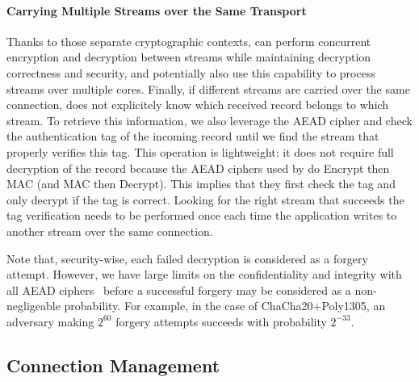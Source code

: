 \paragraph*{Carrying Multiple Streams over the Same Transport}
Thanks to those separate cryptographic contexts, \tcpls can perform concurrent
encryption and decryption between streams while maintaining decryption
correctness and security, and potentially also use this capability to process
streams over multiple cores. Finally, if different streams are carried
over the same \tcp connection, \tcpls does not explicitely know which
received record belongs to which stream. To retrieve this information,
we also
leverage the AEAD cipher and check the authentication tag of the incoming record until we find the stream that properly verifies this tag. This
operation is lightweight: it does not require full decryption of the record
because the AEAD ciphers used by  do Encrypt then MAC (and MAC then
Decrypt). This implies that they first check the tag and only decrypt if the tag is correct. Looking for the right stream that succeeds the tag verification needs to be performed once each time the application writes to another stream over the same \tcp connection.

Note that, security-wise, each failed decryption is considered as a
forgery attempt. However, we have large limits on the confidentiality and
integrity with all AEAD ciphers~\cite{luykx2015limits, aeadlimits} before a
successful forgery may be considered as a non-negligeable probability. For
example, in the case of ChaCha20+Poly1305, an adversary making $2^{60}$ forgery
attempts succeeds with probability $2^{-33}$.



\subsection{Connection Management}\label{sec:multipath}

